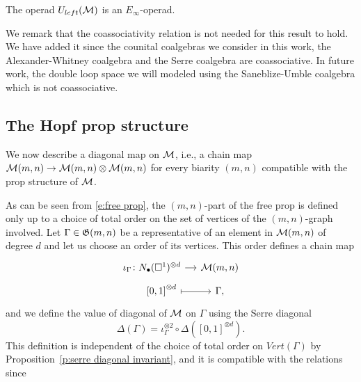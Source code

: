 \begin{proposition}
	The operad $U_{left}(\mathcal{M})$ is an $E_\infty$-operad.
\end{proposition}

We remark that the coassociativity relation is not needed for this result to hold.
We have added it since the counital coalgebras we consider in this work, the Alexander-Whitney coalgebra and the Serre coalgebra are coassociative.
In future work, the double loop space we will modeled using the Saneblize-Umble coalgebra which is not coassociative.

\subsection{The Hopf prop structure} \label{ss:hopf prop structure}

We now describe a diagonal map on $\mathcal{M}$, i.e., a chain map $\mathcal{M}(m,n) \to \mathcal{M}(m,n) \otimes \mathcal{M}(m,n)$ for every biarity $(m,n)$ compatible with the prop structure of $\mathcal{M}$.

As can be seen from \eqref{e:free prop}, the $(m,n)$-part of the free prop is defined only up to a choice of total order on the set of vertices of the $(m,n)$-graph involved.
Let $\Gamma \in \mathfrak{G}(m,n)$ be a representative of an element in $\mathcal{M}(m,n)$ of degree $d$ and let us choose an order of its vertices.
This order defines a chain map
\begin{equation*}
\begin{tikzcd}[row sep=tiny, column sep=small]
\iota_\Gamma \colon \chains(\square^1)^{\otimes d} \arrow[r] & \M(m,n) \\
\qquad {[0,1]}^{\otimes d} \arrow[r, |->] & \Gamma,
\end{tikzcd}
\end{equation*}
and we define the value of diagonal of $\mathcal{M}$ on $\Gamma$ using the Serre diagonal
\begin{equation} \label{e:diagonal of M}
\Delta(\Gamma) = \iota_\Gamma^{\otimes 2} \circ \Delta \left([0,1]^{\otimes d}\right).
\end{equation}
This definition is independent of the choice of total order on $Vert(\Gamma)$ by Proposition~\ref{p:serre diagonal invariant}, and it is compatible with the relations since

